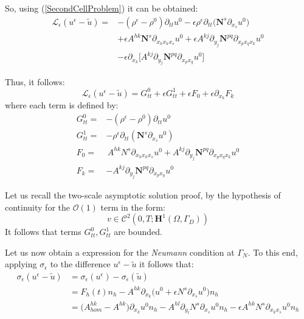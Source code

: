 So, using (\ref{SecondCellProblem}) it can be obtained:
\begin{align*}
    \mathcal{L}_{\epsilon} (u^{\epsilon} -\tilde{u})  = & - (\rho^{\epsilon}-\rho^0) \partial_{tt} u^0 - \epsilon \rho^{\epsilon} \partial_{tt}\big(\mathbf{N}^s \partial_{x_s}u^0 \big)  \\
    & + \epsilon A^{hk} \mathbf{N}^s \partial_{x_h x_k x_s} u^0 + \epsilon A^{kj} \partial_{y_j} \mathbf{N}^{pq} \partial_{x_p x_q x_k} u^0  \\
    & - \epsilon \partial_{x_k} \big[ A^{kj} \partial_{y_j} \mathbf{N}^{pq} \partial_{x_p x_q} u^0\big] 
\end{align*}

Thus, it follows:
\begin{equation}
    \mathcal{L}_{\epsilon} (u^{\epsilon}-\tilde{u}) = G_{tt}^0 + \epsilon G_{tt}^1 + \epsilon F_0 + \epsilon \partial_{x_k} F_k
\end{equation}
where each term is defined by:
\begin{equation}
    \label{Variables}
    \begin{aligned}
        G_{tt}^0 = & -(\rho^{\epsilon} - \rho^0) \partial_{tt}u^0 \\
        G_{tt}^1 = & -\rho^{\epsilon} \partial_{tt}(\mathbf{N}^s \partial_{x_s} u^0) \\
        F_0 = & \, A^{hk}N^s \partial_{x_h x_k x_s} u^0  + A^{kj}\partial_{y_j} \mathbf{N}^{pq} \partial_{x_p x_q x_k} u^0 \\
        F_k = & - A^{kj} \partial_{y_j} \mathbf{N}^{pq} \partial_{x_p x_q} u^0 
    \end{aligned}
\end{equation}

\begin{rem}
Let us recall the two-scale asymptotic solution proof, by the hypothesis of continuity for the $\mathcal{O}(1)$ term in the form:
\begin{equation*}
    v \in \mathcal{C}^2(0,T; \mathbf{H}^1(\Omega, \Gamma_D))
\end{equation*}
It follows that terms $G^0_{tt}, G_{tt}^1$ are bounded.
\end{rem}

Let us now obtain a expression for the \textit{Neumann} condition at $\Gamma_N$. To this end, applying $\sigma_{\epsilon}$ to the difference $u^{\epsilon} - \tilde{u}$ it follows that:
\begin{align*}
    \sigma_{\epsilon} (u^{\epsilon} - \tilde{u}) & =  \sigma_{\epsilon}(u^{\epsilon}) - \sigma_{\epsilon} (\tilde{u}) \\
    & = F_h(t) n_h - A^{hk} \partial_{x_k} \big( u^0 + \epsilon N^s \partial_{x_s}u^0 \big)n_h \\
    & = \big(A^{hk}_{hom} - A^{hk} \big) \partial_{x_k} u^0 n_h - A^{hl} \partial_{y_l} N^s \partial_{x_s} u^0 n_h - \epsilon A^{hk} N^s \partial_{x_k x_s} u^0 n_h
\end{align*}

